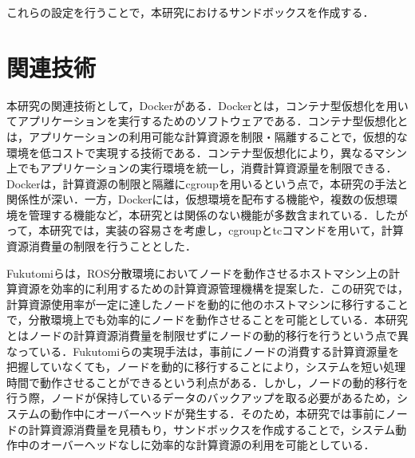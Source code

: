 \documentclass[11pt]{ujarticle} %
\begin{document}
これらの設定を行うことで，本研究におけるサンドボックスを作成する．

\section{関連技術}
本研究の関連技術として，Dockerがある．Dockerとは，コンテナ型仮想化を用いてアプリケーションを実行するためのソフトウェアである．コンテナ型仮想化とは，アプリケーションの利用可能な計算資源を制限・隔離することで，仮想的な環境を低コストで実現する技術である．コンテナ型仮想化により，異なるマシン上でもアプリケーションの実行環境を統一し，消費計算資源量を制限できる．Dockerは，計算資源の制限と隔離にcgroupを用いるという点で，本研究の手法と関係性が深い．一方，Dockerには，仮想環境を配布する機能や，複数の仮想環境を管理する機能など，本研究とは関係のない機能が多数含まれている．したがって，本研究では，実装の容易さを考慮し，cgroupとtcコマンドを用いて，計算資源消費量の制限を行うこととした．

Fukutomiらは，ROS分散環境においてノードを動作させるホストマシン上の計算資源を効率的に利用するための計算資源管理機構を提案した\cite{ResourceManeger}．この研究では，計算資源使用率が一定に達したノードを動的に他のホストマシンに移行することで，分散環境上でも効率的にノードを動作させることを可能としている．本研究とはノードの計算資源消費量を制限せずにノードの動的移行を行うという点で異なっている．Fukutomiらの実現手法は，事前にノードの消費する計算資源量を把握していなくても，ノードを動的に移行することにより，システムを短い処理時間で動作させることができるという利点がある．しかし，ノードの動的移行を行う際，ノードが保持しているデータのバックアップを取る必要があるため，システムの動作中にオーバーヘッドが発生する．そのため，本研究では事前にノードの計算資源消費量を見積もり，サンドボックスを作成することで，システム動作中のオーバーヘッドなしに効率的な計算資源の利用を可能としている．
\end{document}
